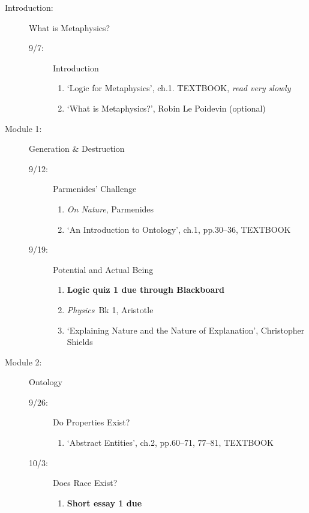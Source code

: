 \documentclass[article,oneside]{memoir}
\begin{document}
\begin{description}
\item[Introduction:]  What  is Metaphysics? 
\begin{description}
\item [9/7:] Introduction
\begin{enumerate}
\item `Logic for Metaphysics', ch.1. TEXTBOOK, \emph{read very slowly}
\item `What is Metaphysics?', Robin Le Poidevin (optional)
\end{enumerate}
\end{description}

\item[Module 1:] Generation \& Destruction
\begin{description}
\item [9/12:] Parmenides' Challenge
\begin{enumerate}
\item \emph{On Nature}, Parmenides
\item `An Introduction to Ontology', ch.1, pp.30--36, TEXTBOOK
\end{enumerate}

\item [9/19:] Potential and Actual Being 
\begin{enumerate}
\item \textbf{Logic quiz 1 due through Blackboard}
\item \emph{Physics}\ Bk 1, Aristotle
\item `Explaining Nature and the Nature of Explanation', Christopher Shields

 
\end{enumerate}
\end{description}

\item[Module 2:] Ontology
\begin{description}

\item [9/26:] Do Properties Exist? 

\begin{enumerate}
\item `Abstract Entities', ch.2, pp.60--71, 77--81, TEXTBOOK
\end{enumerate}

\item[10/3: ] Does Race Exist? 

\begin{enumerate}
\item \textbf{Short essay 1 due}


\end{enumerate}
\end{description}
\end{description}
\end{document}
